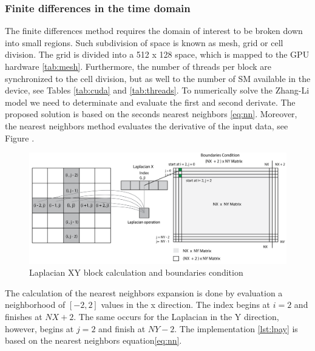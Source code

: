 \subsubsection{Finite differences in the time domain}

The finite differences method requires the domain of interest to be broken down into small regions. Such subdivision of space is known as mesh, grid or cell division. The grid is divided into a 512 x 128 space, which is mapped to the GPU hardware \ref{tab:mesh}. Furthermore, the number of threads per block are synchronized to the cell division, but as well to the number of SM available in the device, see Tables \ref{tab:cuda} and  \ref{tab:threads}.
To numerically solve the Zhang-Li model we need to determinate and evaluate the first and second derivate. The proposed solution is based on the seconds nearest neighbors \ref{eq:nn}. Moreover, the nearest neighbors method evaluates the derivative of the input data, see Figure \label{fig:laplacian}.

\begin{figure}[htbp]
	\centering
		\includegraphics[width=1.0\textwidth]{Figures/laplacian.png}
		\smallskip
	\caption[Laplacian block calculation]{Laplacian XY block calculation and boundaries condition}
	\label{fig:laplacian}
\end{figure}

The calculation of the nearest neighbors expansion is done by evaluation a neighborhood of $[-2, 2]$ values in the x direction. The index begins at $i = 2$ and finishes at $NX + 2$. The same occurs for the Laplacian in the Y direction, however, begins at $j = 2$ and finish at $NY -2$.  The implementation \ref{lst:lpay} is based on the nearest neighbors equation\ref{eq:nn}.

